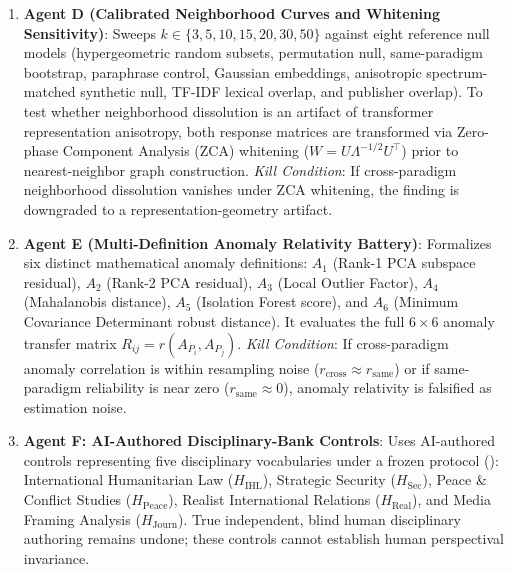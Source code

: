 \begin{enumerate}
    \emph{Kill Condition}: If low-capacity mappings ($T_0$--$T_5$) predict held-out cross-paradigm geometry with high fidelity ($R^2_{\text{test}} > 0.70$ and $J_{10,\text{test}} > 0.40$), incommensurability is falsified as trivial linear coordinate rotation.
    \item \textbf{Agent D (Calibrated Neighborhood Curves and Whitening Sensitivity)}: Sweeps $k \in \{3, 5, 10, 15, 20, 30, 50\}$ against eight reference null models (hypergeometric random subsets, permutation null, same-paradigm bootstrap, paraphrase control, Gaussian embeddings, anisotropic spectrum-matched synthetic null, TF-IDF lexical overlap, and publisher overlap). To test whether neighborhood dissolution is an artifact of transformer representation anisotropy, both response matrices are transformed via Zero-phase Component Analysis (ZCA) whitening ($W = U \Lambda^{-1/2} U^\top$) prior to nearest-neighbor graph construction.
    \emph{Kill Condition}: If cross-paradigm neighborhood dissolution vanishes under ZCA whitening, the finding is downgraded to a representation-geometry artifact.
    \item \textbf{Agent E (Multi-Definition Anomaly Relativity Battery)}: Formalizes six distinct mathematical anomaly definitions: $A_1$ (Rank-1 PCA subspace residual), $A_2$ (Rank-2 PCA residual), $A_3$ (Local Outlier Factor), $A_4$ (Mahalanobis distance), $A_5$ (Isolation Forest score), and $A_6$ (Minimum Covariance Determinant robust distance). It evaluates the full $6 \times 6$ anomaly transfer matrix $R_{ij} = r(A_{P_i}, A_{P_j})$.
    \emph{Kill Condition}: If cross-paradigm anomaly correlation is within resampling noise ($r_{\text{cross}} \approx r_{\text{same}}$) or if same-paradigm reliability is near zero ($r_{\text{same}} \approx 0$), anomaly relativity is falsified as estimation noise.
    \item \textbf{Agent F: AI-Authored Disciplinary-Bank Controls}: Uses AI-authored controls representing five disciplinary vocabularies under a frozen protocol (): International Humanitarian Law ($H_{\text{IHL}}$), Strategic Security ($H_{\text{Sec}}$), Peace \& Conflict Studies ($H_{\text{Peace}}$), Realist International Relations ($H_{\text{Real}}$), and Media Framing Analysis ($H_{\text{Journ}}$). True independent, blind human disciplinary authoring remains undone; these controls cannot establish human perspectival invariance.
\end{enumerate}

